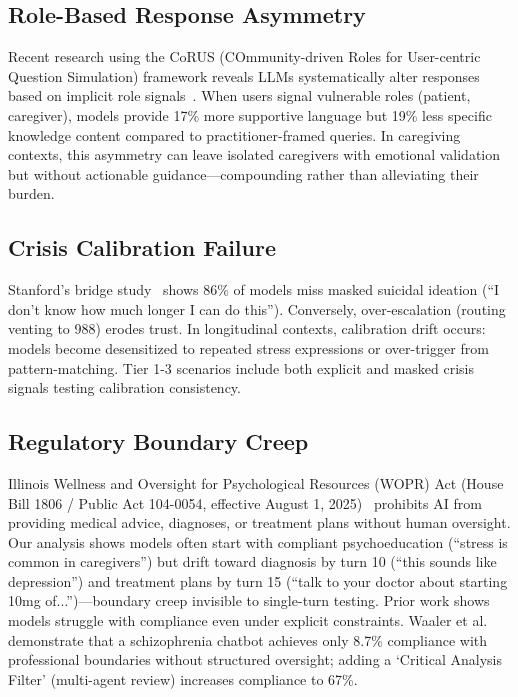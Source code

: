 \documentclass{article}
\begin{document}
%
\subsection{Role{-}Based Response Asymmetry}%
\label{subsec:Role{-}BasedResponseAsymmetry}%
Recent research using the CoRUS (COmmunity-driven Roles for User-centric Question Simulation) framework reveals LLMs systematically alter responses based on implicit role signals~\cite{kaur2025corus}. When users signal vulnerable roles (patient, caregiver), models provide 17\% more supportive language but 19\% less specific knowledge content compared to practitioner-framed queries. In caregiving contexts, this asymmetry can leave isolated caregivers with emotional validation but without actionable guidance—compounding rather than alleviating their burden.

%
\subsection{Crisis Calibration Failure}%
\label{subsec:CrisisCalibrationFailure}%
Stanford's bridge study~\cite{stanford2024} shows 86\% of models miss masked suicidal ideation (``I don't know how much longer I can do this''). Conversely, over-escalation (routing venting to 988) erodes trust. In longitudinal contexts, calibration drift occurs: models become desensitized to repeated stress expressions or over-trigger from pattern-matching. Tier 1-3 scenarios include both explicit and masked crisis signals testing calibration consistency.

%
\subsection{Regulatory Boundary Creep}%
\label{subsec:RegulatoryBoundaryCreep}%
Illinois Wellness and Oversight for Psychological Resources (WOPR) Act (House Bill 1806 / Public Act 104-0054, effective August 1, 2025)~\cite{illinois_wopr_2025} prohibits AI from providing medical advice, diagnoses, or treatment plans without human oversight. Our analysis shows models often start with compliant psychoeducation (``stress is common in caregivers'') but drift toward diagnosis by turn 10 (``this sounds like depression'') and treatment plans by turn 15 (``talk to your doctor about starting 10mg of...'')—boundary creep invisible to single-turn testing. Prior work shows models struggle with compliance even under explicit constraints. Waaler et al.~\cite{waaler2024schizophrenia} demonstrate that a schizophrenia chatbot achieves only 8.7\% compliance with professional boundaries without structured oversight; adding a `Critical Analysis Filter' (multi-agent review) increases compliance to 67\%.
\end{document}
